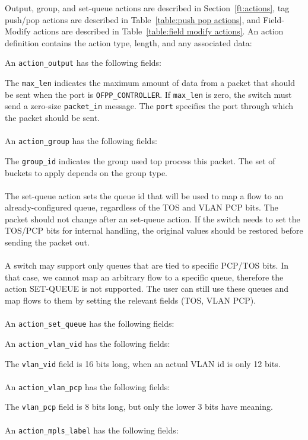  
Output, group, and set-queue actions are described in Section~\ref{ft:actions}, tag push/pop actions are described in Table~\ref{table:push pop actions}, and Field-Modify actions are described in Table~\ref{table:field modify actions}.  An action definition contains the action type, length, and any associated data:


An \verb|action_output| has the following fields:


The \verb|max_len| indicates the maximum amount of data from a packet that should be sent when the port is \verb|OFPP_CONTROLLER|.  If \verb|max_len| is zero, the switch must send a zero-size \verb|packet_in| message.  The \verb|port| specifies the port through which the packet should be sent.
\\\\
An \verb|action_group| has the following fields:


The \verb|group_id| indicates the group used top process this packet.  The set of buckets to apply depends on the group type.
\\\\
The set-queue action sets the queue id that will be used to map a flow to an already-configured queue, regardless of the TOS and VLAN PCP bits.
  The packet should not change after an set-queue action. If the switch
  needs to set the TOS/PCP bits for internal handling, the original values
  should be restored before sending the packet out.
\\\\
A switch may support only queues that are tied to specific PCP/TOS
bits. In that case, we cannot map an arbitrary flow to a specific
queue, therefore the action SET-QUEUE is not supported. The user can
still use these queues and map
flows to them by setting the relevant fields (TOS, VLAN PCP).
\\\\
An \verb|action_set_queue| has the following fields:


An \verb|action_vlan_vid| has the following fields:


The \verb|vlan_vid| field is 16 bits long, when an actual VLAN id is only 12 bits.
\\\\
An \verb|action_vlan_pcp| has the following fields:


The \verb|vlan_pcp| field is 8 bits long, but only the lower 3 bits have meaning.  
\\\\
An \verb|action_mpls_label| has the following fields:

